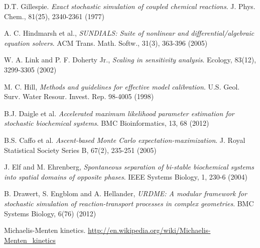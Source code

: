 \documentclass[report,openany]{memoir}
\title{\rightline{\HUGE StochSS: Stochastic Simulation Service}}
\date{}
\begin{document}
\maketitle

\tableofcontents


%











\begin{thebibliography}{9}

  D.T. Gillespie.
  \textit{Exact stochastic simulation of coupled chemical reactions}.
  J. Phys. Chem., 81(25), 2340-2361 (1977)

  A. C. Hindmarsh et al.,
  \textit{SUNDIALS: Suite of nonlinear and differential/algebraic equation solvers}.
  ACM Trans. Math. Softw., 31(3), 363-396 (2005)
  
  W. A. Link and P. F. Doherty Jr.,
  \textit{Scaling in sensitivity analysis}.
  Ecology, 83(12), 3299-3305 (2002)
  
  M. C. Hill,
  \textit{Methods and guidelines for effective model calibration}. 
  U.S. Geol. Surv. Water Resour. Invest. Rep. 98-4005 (1998)
  
  B.J. Daigle et al.
  \textit{Accelerated maximum likelihood parameter estimation for stochastic biochemical systems}.
  BMC Bioinformatics, 13, 68 (2012)
  
  B.S. Caffo et al.
  \textit{Ascent-based Monte Carlo expectation-maximization}. 
  J. Royal Statistical Society Series B, 67(2), 235-251 (2005)
  
  J. Elf and M. Ehrenberg,
  \textit{Spontaneous separation of bi-stable biochemical systems into spatial domains of opposite phases}. IEEE Systems Biology, 1, 230-6 (2004)
  
 B. Drawert, S. Engblom and A. Hellander, 
 \textit{URDME: {A} modular framework for stochastic simulation
of reaction-transport processes in complex geometries}. BMC Systems Biology, 6(76) (2012)
  
  Michaelis-Menten kinetics. 
  \url{http://en.wikipedia.org/wiki/Michaelis-Menten_kinetics}
  
\end{thebibliography}
\end{document}
